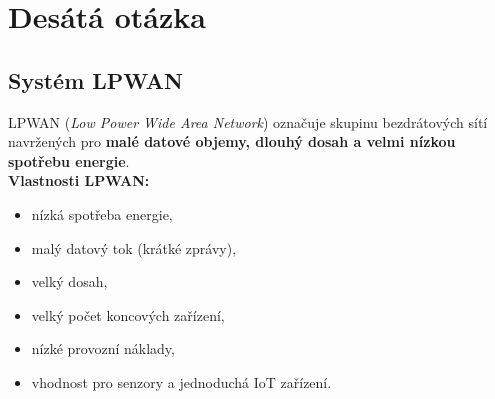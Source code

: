 \chapter{Desátá otázka}
\section{Systém LPWAN}
LPWAN (\textit{Low Power Wide Area Network}) označuje skupinu bezdrátových sítí navržených pro \textbf{malé datové objemy, dlouhý dosah a velmi nízkou spotřebu energie}.\\
\textbf{Vlastnosti LPWAN:}
\begin{itemize}
	\item nízká spotřeba energie,
	\item malý datový tok (krátké zprávy),
	\item velký dosah,
	\item velký počet koncových zařízení,
	\item nízké provozní náklady,
	\item vhodnost pro senzory a jednoduchá IoT zařízení.
\end{itemize}

